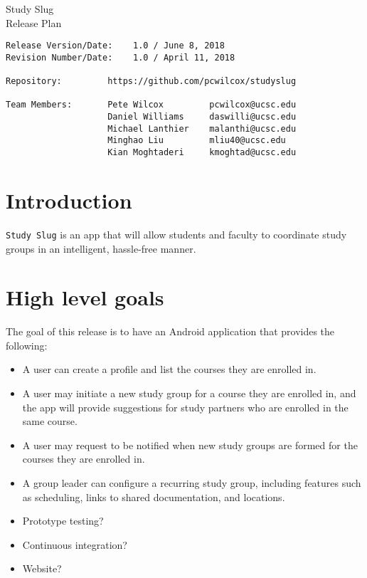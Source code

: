 \documentclass[10pt]{article}
\begin{document}
    
    \begin{center}
        \Huge{Study Slug} \\
        \Large{Release Plan}
    \end{center}
    \begin{verbatim}
Release Version/Date:    1.0 / June 8, 2018        
Revision Number/Date:    1.0 / April 11, 2018

Repository:         https://github.com/pcwilcox/studyslug

Team Members:       Pete Wilcox         pcwilcox@ucsc.edu    
                    Daniel Williams     daswilli@ucsc.edu  
                    Michael Lanthier    malanthi@ucsc.edu  
                    Minghao Liu         mliu40@ucsc.edu
                    Kian Moghtaderi     kmoghtad@ucsc.edu
    \end{verbatim}
    
    \section{Introduction}
    \texttt{Study Slug} is an app that will allow students and faculty to coordinate study groups in an intelligent, hassle-free manner.
    
    \section{High level goals}
    The goal of this release is to have an Android application that provides the following:
    \begin{itemize}
        \item A user can create a profile and list the courses they are enrolled in.
        \item A user may initiate a new study group for a course they are enrolled in, and the app will provide suggestions for study partners who are enrolled in the same course.
        \item A user may request to be notified when new study groups are formed for the courses they are enrolled in.
        \item A group leader can configure a recurring study group, including features such as scheduling, links to shared documentation, and locations.
        \item Prototype testing?
        \item Continuous integration?
        \item Website?
    \end{itemize}
    
\end{document}
